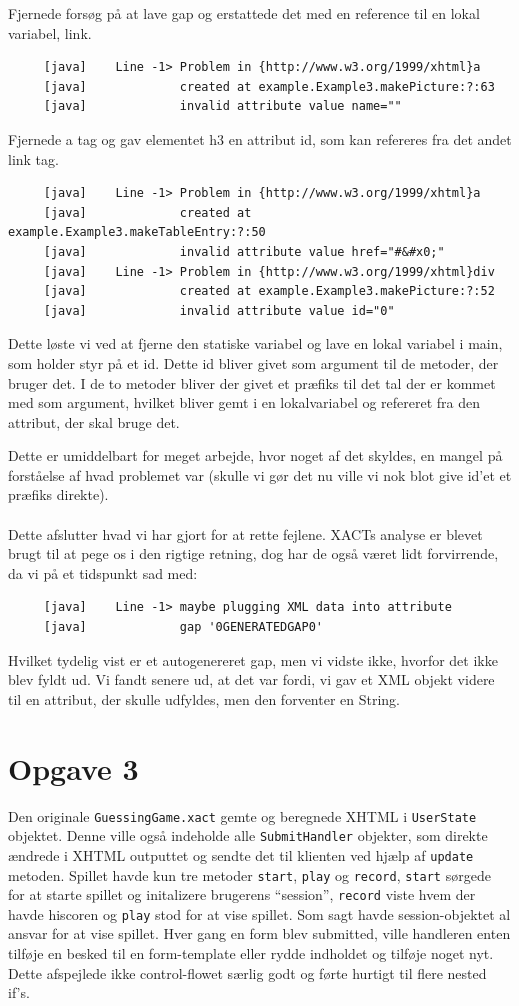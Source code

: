 \documentclass[a4paper,10pt]{article}
\begin{document}
Fjernede forsøg på at lave gap og erstattede det med en reference til en lokal variabel, link.
\begin{lstlisting}
     [java]    Line -1> Problem in {http://www.w3.org/1999/xhtml}a 
     [java]             created at example.Example3.makePicture:?:63
     [java]             invalid attribute value name=""
\end{lstlisting}
Fjernede a tag og gav elementet h3 en attribut id, som kan refereres fra det andet link tag.
\begin{lstlisting}
     [java]    Line -1> Problem in {http://www.w3.org/1999/xhtml}a 
     [java]             created at example.Example3.makeTableEntry:?:50
     [java]             invalid attribute value href="#&#x0;"
     [java]    Line -1> Problem in {http://www.w3.org/1999/xhtml}div 
     [java]             created at example.Example3.makePicture:?:52
     [java]             invalid attribute value id="0"
\end{lstlisting}
Dette løste vi ved at fjerne den statiske variabel og lave en lokal variabel i main, som holder styr på et id. Dette id bliver givet som argument til de metoder, der bruger det. I de to metoder bliver der givet et præfiks til det tal der er kommet med som argument, hvilket bliver gemt i en lokalvariabel og refereret fra den attribut, der skal bruge det.

Dette er umiddelbart for meget arbejde, hvor noget af det skyldes, en mangel på forståelse af hvad problemet var (skulle vi gør det nu ville vi nok blot give id'et et præfiks direkte).\\\\
Dette afslutter hvad vi har gjort for at rette fejlene. XACTs analyse er blevet brugt til at pege os i den rigtige retning, dog har de også været lidt forvirrende, da vi på et tidspunkt sad med:
\begin{lstlisting}
     [java]    Line -1> maybe plugging XML data into attribute
     [java]             gap '0GENERATEDGAP0'
\end{lstlisting} 
Hvilket tydelig vist er et autogenereret gap, men vi vidste ikke, hvorfor det ikke blev fyldt ud. Vi fandt senere ud, at det var fordi, vi gav et XML objekt videre til en attribut, der skulle udfyldes, men den forventer en String.
\section*{Opgave 3}
Den originale \texttt{GuessingGame.xact} gemte og beregnede XHTML i \texttt{UserState} objektet. Denne ville også indeholde alle \texttt{SubmitHandler} objekter, som direkte ændrede i XHTML outputtet og sendte det til klienten ved hjælp af \texttt{update} metoden. Spillet havde kun tre metoder \texttt{start}, \texttt{play} og \texttt{record}, \texttt{start} sørgede for at starte spillet og initalizere brugerens ``session'', \texttt{record} viste hvem der havde hiscoren og \texttt{play} stod for at vise spillet. Som sagt havde session-objektet al ansvar for at vise spillet. Hver gang en form blev submitted, ville handleren enten tilføje en besked til en form-template eller rydde indholdet og tilføje noget nyt. Dette afspejlede ikke control-flowet særlig godt og førte hurtigt til flere nested if's. 
\end{document}
